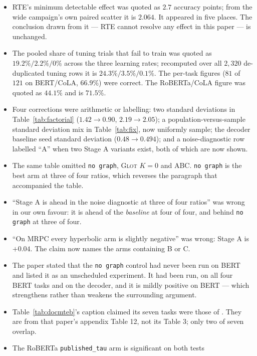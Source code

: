 \documentclass{article}
\begin{document}
\begin{itemize}
\itemsep1pt
\item RTE's minimum detectable effect was quoted as $2.7$ accuracy points; from
      the wide campaign's own paired scatter it is $2.064$. It appeared in five
      places. The conclusion drawn from it --- RTE cannot resolve any effect in
      this paper --- is unchanged.
\item The pooled share of tuning trials that fail to train was quoted as
      $19.2\%/2.2\%/0\%$ across the three learning rates; recomputed over all
      $2{,}320$ de-duplicated tuning rows it is $24.3\%/3.5\%/0.1\%$. The
      per-task figures ($81$ of $121$ on BERT/CoLA, $66.9\%$) were correct. The
      RoBERTa/CoLA figure was quoted as $44.1\%$ and is $71.5\%$.
\item Four corrections were arithmetic or labelling: two standard deviations in
      Table~\ref{tab:factorial} ($1.42 \rightarrow 0.90$,
      $2.19 \rightarrow 2.05$); a population-versus-sample standard deviation
      mix in Table~\ref{tab:fix}, now uniformly sample; the decoder baseline
      seed standard deviation ($0.48 \rightarrow 0.494$); and a
      noise-diagnostic row labelled ``A'' when two Stage A variants exist, both
      of which are now shown.
\item The same table omitted \texttt{no graph}, \textsc{Glot} $K{=}0$ and ABC.
      \texttt{no graph} is the best arm at three of four ratios, which reverses
      the paragraph that accompanied the table.
\item ``Stage A is ahead in the noise diagnostic at three of four ratios'' was
      wrong in our own favour: it is ahead of the \emph{baseline} at four of
      four, and behind \texttt{no graph} at three of four.
\item ``On MRPC every hyperbolic arm is slightly negative'' was wrong: Stage A
      is $+0.04$. The claim now names the arms containing B or C.
\item The paper stated that the \texttt{no graph} control had never been run on
      BERT and listed it as an unscheduled experiment. It had been run, on all
      four BERT tasks and on the decoder, and it is mildly positive on BERT ---
      which strengthens rather than weakens the surrounding argument.
\item Table~\ref{tab:docmteb}'s caption claimed its seven tasks were those of
      \citet{mantri2026glot}. They are from that paper's appendix Table 12, not
      its Table 3; only two of seven overlap.
\item The RoBERTa \texttt{published\_tau} arm is significant on both tests

\end{itemize}
\end{document}
